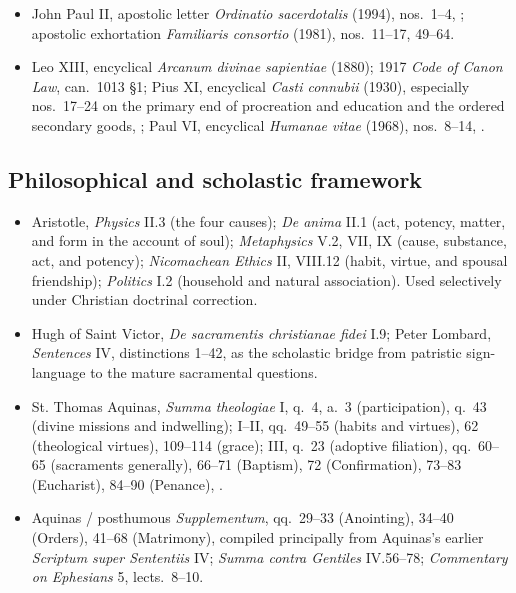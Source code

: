 {\begin{itemize}[nosep]
\item John Paul II, apostolic letter \emph{Ordinatio sacerdotalis} (1994), nos.~1--4, ; apostolic exhortation \emph{Familiaris consortio} (1981), nos.~11--17, 49--64.
\item Leo XIII, encyclical \emph{Arcanum divinae sapientiae} (1880); 1917 \emph{Code of Canon Law}, can.~1013 \S1; Pius XI, encyclical \emph{Casti connubii} (1930), especially nos.~17--24 on the primary end of procreation and education and the ordered secondary goods, ; Paul VI, encyclical \emph{Humanae vitae} (1968), nos.~8--14, .
\end{itemize}
}

\subsection*{Philosophical and scholastic framework}
{\footnotesize
\begin{itemize}[nosep]
\item Aristotle, \emph{Physics} II.3 (the four causes); \emph{De anima} II.1 (act, potency, matter, and form in the account of soul); \emph{Metaphysics} V.2, VII, IX (cause, substance, act, and potency); \emph{Nicomachean Ethics} II, VIII.12 (habit, virtue, and spousal friendship); \emph{Politics} I.2 (household and natural association). Used selectively under Christian doctrinal correction.
\item Hugh of Saint Victor, \emph{De sacramentis christianae fidei} I.9; Peter Lombard, \emph{Sentences} IV, distinctions 1--42, as the scholastic bridge from patristic sign-language to the mature sacramental questions.
\item St. Thomas Aquinas, \emph{Summa theologiae} I, q.~4, a.~3 (participation), q.~43 (divine missions and indwelling); I--II, qq.~49--55 (habits and virtues), 62 (theological virtues), 109--114 (grace); III, q.~23 (adoptive filiation), qq.~60--65 (sacraments generally), 66--71 (Baptism), 72 (Confirmation), 73--83 (Eucharist), 84--90 (Penance), .
\item Aquinas / posthumous \emph{Supplementum}, qq.~29--33 (Anointing), 34--40 (Orders), 41--68 (Matrimony), compiled principally from Aquinas's earlier \emph{Scriptum super Sententiis} IV; \emph{Summa contra Gentiles} IV.56--78; \emph{Commentary on Ephesians} 5, lects.~8--10.
\end{itemize}
}


